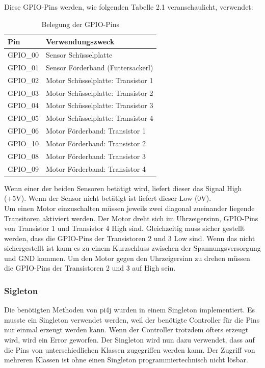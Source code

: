 \newpage

Diese GPIO-Pins werden, wie folgenden Tabelle 2.1 veranschaulicht, verwendet:

\begin{table}[htb]
\centering
\begin{tabular}{|l|l|}
\hline
\textbf{Pin} & \textbf{Verwendungszweck}          \\ \hline
GPIO\_00     & Sensor Schüsselplatte              \\ \hline
GPIO\_01     & Sensor Förderband (Futtersackerl)  \\ \hline
GPIO\_02     & Motor Schüsselplatte: Transistor 1 \\ \hline
GPIO\_03     & Motor Schüsselplatte: Transistor 2 \\ \hline
GPIO\_04     & Motor Schüsselplatte: Transistor 3 \\ \hline
GPIO\_05     & Motor Schüsselplatte: Transistor 4 \\ \hline
GPIO\_06     & Motor Förderband: Transistor 1     \\ \hline
GPIO\_10     & Motor Förderband: Transistor 2     \\ \hline
GPIO\_08     & Motor Förderband: Transistor 3     \\ \hline
GPIO\_09     & Motor Förderband: Transistor 4     \\ \hline
\end{tabular}
\caption{Belegung der GPIO-Pins}
\label{Pinbelegung}
\end{table}

Wenn einer der beiden Sensoren betätigt wird, liefert dieser das Signal High (+5V). Wenn der Sensor nicht betätigt ist liefert dieser Low (0V). 
\\ Um einen Motor einzuschalten müssen jeweils zwei diagonal zueinander liegende Transitoren aktiviert werden. Der Motor dreht sich im Uhrzeigersinn, GPIO-Pins von Transistor 1 und Transistor 4 High sind. Gleichzeitig muss sicher gestellt werden, dass die GPIO-Pins der Transistoren 2 und 3 Low sind. Wenn das nicht sichergestellt ist kann es zu einem Kurzschluss zwischen der Spannungsversorgung und GND kommen. Um den Motor gegen den Uhrzeigersinn zu drehen müssen die GPIO-Pins der Transistoren 2 und 3 auf High sein. 

\subsubsection{Sigleton}
Die benötigten Methoden von pi4j wurden in einem Singleton implementiert. Es musste ein Singleton verwendet werden, weil der benötigte Controller für die Pins nur einmal erzeugt werden kann. Wenn der Controller trotzdem öfters erzeugt wird, wird  ein Error geworfen. Der Singleton wird nun dazu verwendet, dass auf die Pins von unterschiedlichen Klassen zugegriffen werden kann. Der Zugriff von mehreren Klassen ist ohne einen Singleton programmiertechnisch nicht lösbar.

